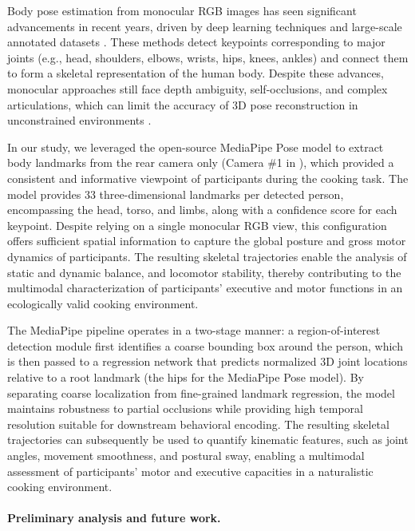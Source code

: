 Body pose estimation from monocular RGB images has seen significant advancements in recent years, driven by deep learning techniques and large-scale annotated datasets \cite{Tang2024AutomaticT}. These methods detect keypoints corresponding to major joints (e.g., head, shoulders, elbows, wrists, hips, knees, ankles) and connect them to form a skeletal representation of the human body. Despite these advances, monocular approaches still face depth ambiguity, self-occlusions, and complex articulations, which can limit the accuracy of 3D pose reconstruction in unconstrained environments \cite{Tang2024AutomaticT}.

In our study, we leveraged the open-source MediaPipe Pose model \cite{lugaresi2019mediapipeframeworkbuildingperception} to extract body landmarks from the rear camera only (Camera \#1 in ), which provided a consistent and informative viewpoint of participants during the cooking task. The model provides 33 three-dimensional landmarks per detected person, encompassing the head, torso, and limbs, along with a confidence score for each keypoint. Despite relying on a single monocular RGB view, this configuration offers sufficient spatial information to capture the global posture and gross motor dynamics of participants. The resulting skeletal trajectories enable the analysis of static and dynamic balance, and locomotor stability, thereby contributing to the multimodal characterization of participants’ executive and motor functions in an ecologically valid cooking environment.

The MediaPipe pipeline operates in a two-stage manner: a region-of-interest detection module first identifies a coarse bounding box around the person, which is then passed to a regression network that predicts normalized 3D joint locations relative to a root landmark (the hips for the MediaPipe Pose model). By separating coarse localization from fine-grained landmark regression, the model maintains robustness to partial occlusions while providing high temporal resolution suitable for downstream behavioral encoding. The resulting skeletal trajectories can subsequently be used to quantify kinematic features, such as joint angles, movement smoothness, and postural sway, enabling a multimodal assessment of participants’ motor and executive capacities in a naturalistic cooking environment.

\paragraph{Preliminary analysis and future work.\\}


